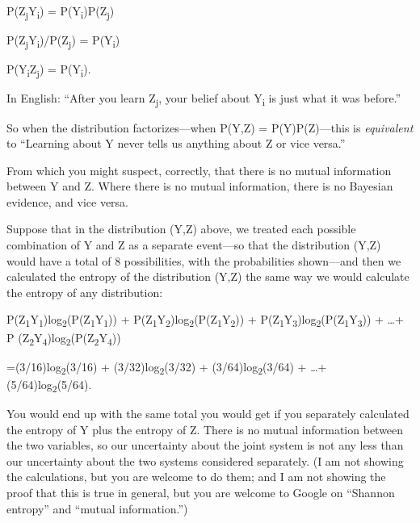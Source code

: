 {\centering
 P(Z\textsubscript{j}Y\textsubscript{i}) =
P(Y\textsubscript{i})P(Z\textsubscript{j})
\par}


\bigskip

{\centering
 P(Z\textsubscript{j}Y\textsubscript{i})/P(Z\textsubscript{j}) =
P(Y\textsubscript{i})
\par}


\bigskip

{\centering
 P(Y\textsubscript{i}{\textbar}Z\textsubscript{j}) =
P(Y\textsubscript{i}).
\par}


\bigskip

{
 In English: ``After you learn Z\textsubscript{j},
your belief about Y\textsubscript{i} is just what it was
before.''}

{
 So when the distribution factorizes---when P(Y,Z) =
P(Y)P(Z)---this is \textit{equivalent} to ``Learning
about Y never tells us anything about Z or vice
versa.''}

{
 From which you might suspect, correctly, that there is no mutual
information between Y and Z. Where there is no mutual information,
there is no Bayesian evidence, and vice versa.}

{
 Suppose that in the distribution (Y,Z) above, we treated each
possible combination of Y and Z as a separate event---so that the
distribution (Y,Z) would have a total of 8 possibilities, with the
probabilities shown---and then we calculated the entropy of the
distribution (Y,Z) the same way we would calculate the entropy of any
distribution:}

{\centering
 P(Z\textsubscript{1}Y\textsubscript{1})log\textsubscript{2}(P(Z\textsubscript{1}Y\textsubscript{1}))
+
P(Z\textsubscript{1}Y\textsubscript{2})log\textsubscript{2}(P(Z\textsubscript{1}Y\textsubscript{2}))
+
P(Z\textsubscript{1}Y\textsubscript{3})log\textsubscript{2}(P(Z\textsubscript{1}Y\textsubscript{3}))
+ \ldots + P
(Z\textsubscript{2}Y\textsubscript{4})log\textsubscript{2}(P(Z\textsubscript{2}Y\textsubscript{4}))
\par}


\bigskip

{\centering
 =(3/16)log\textsubscript{2}(3/16) +
(3/32)log\textsubscript{2}(3/32) + (3/64)log\textsubscript{2}(3/64) +
\ldots + (5/64)log\textsubscript{2}(5/64).
\par}


\bigskip

{
 You would end up with the same total you would get if you
separately calculated the entropy of Y plus the entropy of Z. There is
no mutual information between the two variables, so our uncertainty
about the joint system is not any less than our uncertainty about the
two systems considered separately. (I am not showing the calculations,
but you are welcome to do them; and I am not showing the proof that
this is true in general, but you are welcome to Google on
``Shannon entropy'' and
``mutual information.'')}

